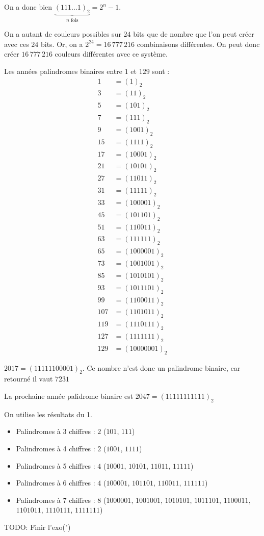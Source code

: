 On a donc bien $\underbrace{(111\dots1)_2}_{\text{$n$ fois}} = 2^n - 1$.

On a autant de couleurs possibles sur $24$ bits que de nombre que l'on peut créer avec ces $24$ bits. Or, on a $2^{24} =16\,777\,216$ combinaisons différentes. On peut donc créer $16\,777\,216$ couleurs différentes avec ce système.

\vspace{3em}

Les années palindromes binaires entre $1$ et $129$ sont :
\begin{equation*}
	\begin{split}
		1 & = (1)_2 \\
		3 & = (11)_2 \\
		5 & = (101)_2 \\
		7 & = (111)_2 \\
		9 & = (1001)_2 \\
		15 & = (1111)_2 \\
		17 & = (10001)_2 \\
		21 & = (10101)_2 \\
		27 & = (11011)_2 \\
		31 & = (11111)_2 \\
		33 & = (100001)_2 \\
		45 & = (101101)_2 \\
		51 & = (110011)_2 \\
		63 & = (111111)_2 \\
		65 & = (1000001)_2 \\
		73 & = (1001001)_2 \\
		85 & = (1010101)_2 \\
		93 & = (1011101)_2 \\
		99 & = (1100011)_2 \\
		107 & = (1101011)_2 \\
		119 & = (1110111)_2 \\
		127 & = (1111111)_2 \\
		129 & = (10000001)_2
	\end{split}
\end{equation*}

$2017 = (11111100001)_2$. Ce nombre n'est donc un palindrome binaire, car retourné il vaut $7231$

La prochaine année palidrome binaire est $2047 = (11111111111)_2$

On utilise les résultats du 1.

\begin{itemize}
	\item Palindromes à 3 chiffres : $2$ ($101$, $111$)
	\item Palindromes à 4 chiffres : $2$ ($1001$, $1111$)
	\item Palindromes à 5 chiffres : $4$ ($10001$, $10101$, $11011$, $11111$)
	\item Palindromes à 6 chiffres : $4$ ($100001$, $101101$, $110011$, $111111$)
	\item Palindromes à 7 chiffres : $8$ ($1000001$, $1001001$, $1010101$, $1011101$, $1100011$, $1101011$, $1110111$, $1111111$)
\end{itemize}


TODO: Finir l'exo(")
